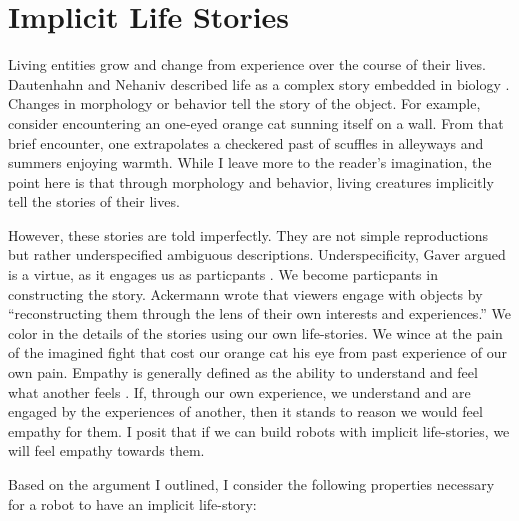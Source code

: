

\section{Implicit Life Stories}
\label{sec_intro_theory}

Living entities grow and change from experience over the course of their lives. Dautenhahn and Nehaniv described life as a complex story embedded in biology \cite{dautenhahn_nehaniv_alife}. Changes in morphology or behavior tell the story of the object. For example, consider encountering an one-eyed orange cat sunning itself on a wall. From that brief encounter, one extrapolates a checkered past of scuffles in alleyways and summers enjoying warmth. While I leave more to the reader's imagination, the point here is that through morphology and behavior, living creatures implicitly tell the stories of their lives. 

However, these stories are told imperfectly. They are not simple reproductions but rather underspecified ambiguous descriptions. Underspecificity, Gaver argued is a virtue, as it engages us as particpants \cite{gaver_ambiguity}. We become particpants in constructing the story. Ackermann wrote that viewers engage with objects by ``reconstructing them through the lens of their own interests and experiences.'' \cite{ackermann_experience_artifact} We color in the details of the stories using our own life-stories. We wince at the pain of the imagined fight that cost our orange cat his eye from past experience of our own pain. Empathy is generally defined as the ability to understand and feel what another feels \cite{decety_human_empathy}. If, through our own experience, we understand and are engaged by the experiences of another, then it stands to reason we would feel empathy for them. I posit that if we can build robots with implicit life-stories, we will feel empathy towards them. 

Based on the argument I outlined, I consider the following properties necessary for a robot to have an implicit life-story:

